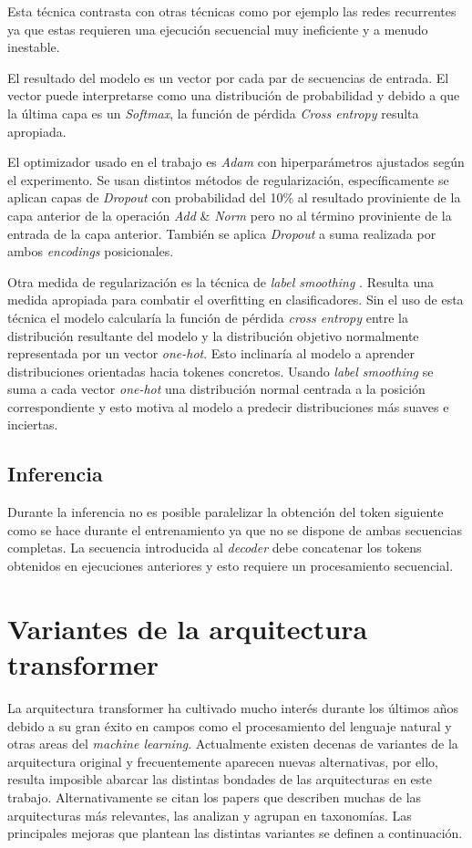 Esta técnica contrasta con otras técnicas como por ejemplo las redes recurrentes ya que estas requieren una ejecución secuencial muy ineficiente y a menudo inestable.

El resultado del modelo es un vector por cada par de secuencias de entrada. El vector puede interpretarse como una distribución de probabilidad y debido a que la última capa es un \textit{Softmax}, la función de pérdida \textit{Cross entropy} resulta apropiada.

El optimizador usado en el trabajo es \textit{Adam} \cite{Kingma2014Dec} con hiperparámetros ajustados según el experimento. Se usan distintos métodos de regularización, específicamente se aplican capas de \textit{Dropout} \cite{Srivastava2014} con probabilidad del 10\% al resultado proviniente de la capa anterior de la operación \textit{Add} \& \textit{Norm} pero no al término proviniente de la entrada de la capa anterior. También se aplica \textit{Dropout} a suma realizada por ambos \textit{encodings} posicionales.

Otra medida de regularización es la técnica de \textit{label smoothing} \cite{Szegedy2015Dec}. Resulta una medida apropiada para combatir el overfitting en clasificadores. Sin el uso de esta técnica el modelo calcularía la función de pérdida \textit{cross entropy} entre la distribución resultante del modelo y la distribución objetivo normalmente representada por un vector \textit{one-hot}. Esto inclinaría al modelo a aprender distribuciones orientadas hacia tokenes concretos. Usando \textit{label smoothing} se suma a cada vector \textit{one-hot} una distribución normal centrada a la posición correspondiente y esto motiva al modelo a predecir distribuciones más suaves e inciertas.

\subsection{Inferencia}
Durante la inferencia no es posible paralelizar la obtención del token siguiente como se hace durante el entrenamiento ya que no se dispone de ambas secuencias completas. La secuencia introducida al \textit{decoder} debe concatenar los tokens obtenidos en ejecuciones anteriores y esto requiere un procesamiento secuencial.

\section{Variantes de la arquitectura transformer} \label{transfvariants}
La arquitectura transformer ha cultivado mucho interés durante los últimos años debido a su gran éxito en campos como el procesamiento del lenguaje natural y otras areas del \textit{machine learning}. Actualmente existen decenas de variantes de la arquitectura original y frecuentemente aparecen nuevas alternativas, por ello, resulta imposible abarcar las distintas bondades de las arquitecturas en este trabajo. Alternativamente se citan los papers \cite{Tay2020Sep, Lin2021Jun} que describen muchas de las arquitecturas más relevantes, las analizan y agrupan en taxonomías. Las principales mejoras que plantean las distintas variantes se definen a continuación.

